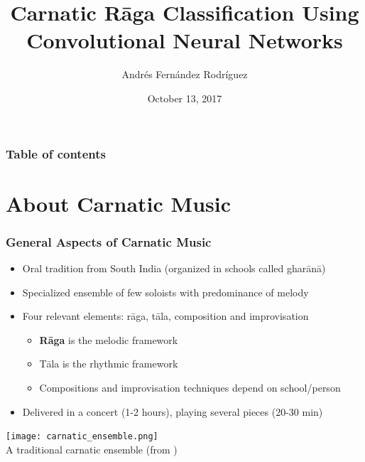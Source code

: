 \documentclass[hyperref={pdfpagelabels=false}]{beamer}
\title[R\=aga Classification]{Carnatic R\=aga Classification Using\\Convolutional Neural Networks}
\author[Andr\'es Fern\'andez Rodr\'iguez]{Andr\'es Fern\'andez Rodr\'iguez}
\institute[]{Goethe Universit\"at Frankfurt am Main}
\date{October 13, 2017}
\begin{document}
     {\frame \titlepage}



     \begin{frame}
       \frametitle{Table of contents}
       \tableofcontents
     \end{frame}



     \section{About Carnatic Music}
     \frame{\sectionpage}

     \begin{frame}
       \frametitle{General Aspects of Carnatic Music}
       \begin{itemize}[<.->]
       \item Oral tradition from South India (organized in schools called ghar\=an\=a)
       \item Specialized ensemble of few soloists with predominance of melody
       \item Four relevant elements: r\=aga, t\=ala, composition and improvisation
         \begin{itemize}[<.->]
         \item \textbf{R\=aga} is the melodic framework
         \item T\=ala is the rhythmic framework
         \item Compositions and improvisation techniques depend on school/person
         \end{itemize}
       \item Delivered in a concert (1-2 hours), playing several pieces (20-30 min)
       \end{itemize}

       \begin{center}
         \texttt{[image: carnatic\_ensemble.png]}
                         {\scriptsize \\A traditional carnatic ensemble (from \cite[p.17]{gulati})}
       \end{center}
     \end{frame}
\end{document}
